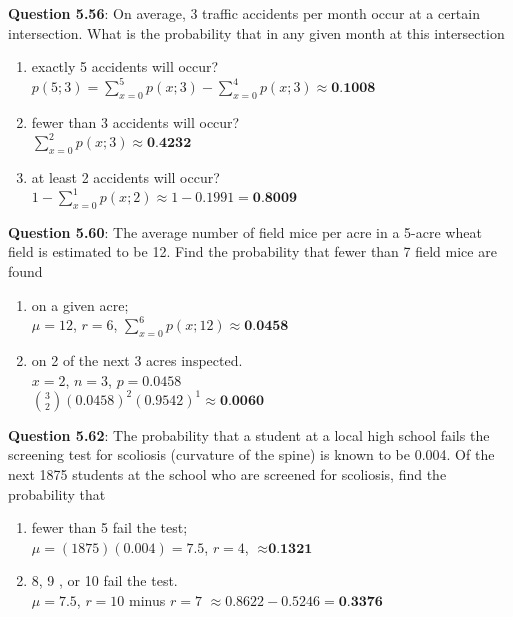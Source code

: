 \documentclass{article}
\begin{document}
    \textbf{Question 5.56}: On average, 3 traffic accidents per month occur
    at a certain intersection. What is the probability that
    in any given month at this intersection
        \begin{enumerate}[label = (\alph*)]
            \item exactly 5 accidents will occur?\\
                $p(5;3) = \sum_{x=0}^{5}p(x;3)-\sum_{x=0}^{4}p(x;3)\approx \textbf{0.1008}$
            \item fewer than 3 accidents will occur?\\
                $\sum_{x=0}^{2}p(x;3) \approx \textbf{0.4232}$
            \item at least 2 accidents will occur?\\
                $1-\sum_{x=0}^{1}p(x;2) \approx 1-0.1991 = \textbf{0.8009}$
        \end{enumerate}
    \textbf{Question 5.60}: The average number of field mice per acre in
    a 5-acre wheat field is estimated to be 12. Find the
    probability that fewer than 7 field mice are found
        \begin{enumerate}[label = (\alph*)]
            \item on a given acre;\\
            $\mu = 12$, $r = 6$, $\sum_{x=0}^{6}p(x;12) \approx \textbf{0.0458}$
            \item on 2 of the next 3 acres inspected.\\
            $x = 2$, $n = 3$, $p = 0.0458$\\
            $\binom{3}{2}(0.0458)^2(0.9542)^1 \approx \textbf{0.0060}$
        \end{enumerate}
    \textbf{Question 5.62}: The probability that a student at a local high
    school fails the screening test for scoliosis (curvature
    of the spine) is known to be 0.004. Of the next 1875
    students at the school who are screened for scoliosis, find the probability that
        \begin{enumerate}[label = (\alph*)]
            \item fewer than 5 fail the test;\\
            $\mu = (1875)(0.004) = 7.5$, $r = 4$, $\approx \textbf{0.1321}$
            \item 8, 9 , or 10 fail the test.\\
            $\mu = 7.5$, $r = 10$ minus $r=7$ $\approx 0.8622 - 0.5246 = \textbf{0.3376}$
        \end{enumerate}
\end{document}
